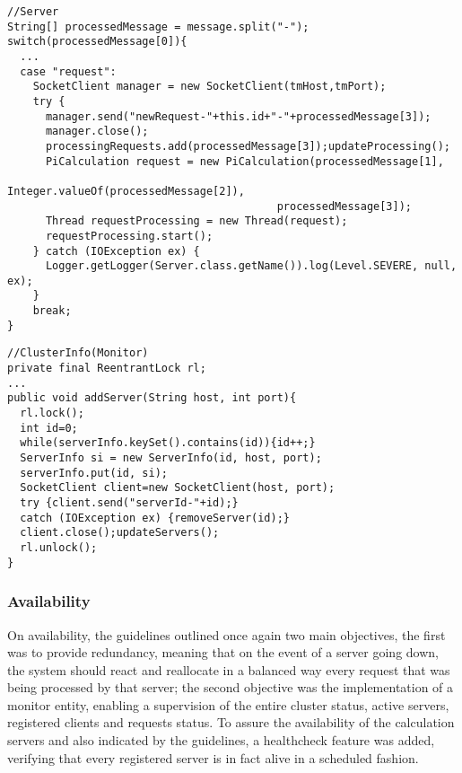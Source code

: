\documentclass[12pt]{article}
\begin{document}
\begin{lstlisting}
//Server
String[] processedMessage = message.split("-");
switch(processedMessage[0]){
  ...
  case "request":
    SocketClient manager = new SocketClient(tmHost,tmPort);
    try {
      manager.send("newRequest-"+this.id+"-"+processedMessage[3]);
      manager.close();
      processingRequests.add(processedMessage[3]);updateProcessing();
      PiCalculation request = new PiCalculation(processedMessage[1], 
                                          Integer.valueOf(processedMessage[2]),
                                          processedMessage[3]);
      Thread requestProcessing = new Thread(request);
      requestProcessing.start();
    } catch (IOException ex) {
      Logger.getLogger(Server.class.getName()).log(Level.SEVERE, null, ex);
    }
    break;
}
\end{lstlisting}

\begin{lstlisting}
//ClusterInfo(Monitor)
private final ReentrantLock rl;
...
public void addServer(String host, int port){
  rl.lock();
  int id=0;
  while(serverInfo.keySet().contains(id)){id++;}
  ServerInfo si = new ServerInfo(id, host, port);
  serverInfo.put(id, si);
  SocketClient client=new SocketClient(host, port);
  try {client.send("serverId-"+id);} 
  catch (IOException ex) {removeServer(id);}
  client.close();updateServers();
  rl.unlock();
}
\end{lstlisting}

\subsubsection{Availability} \label{availability}

On availability, the guidelines outlined once again two main objectives, the first was to provide redundancy, meaning that on the event of a server going down, the system should react and reallocate in a balanced way every request that was being processed by that server; the second objective was the implementation of a monitor entity, enabling a supervision of the entire cluster status, active servers, registered clients and requests status. To assure the availability of the calculation servers and also indicated by the guidelines, a healthcheck feature was added, verifying that every registered server is in fact alive in a scheduled fashion.
\end{document}
